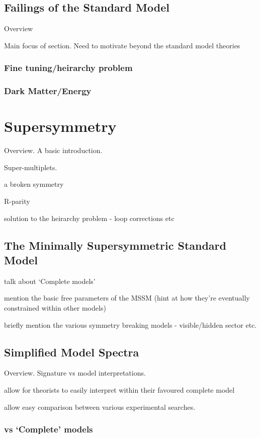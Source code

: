 \subsection{Failings of the Standard Model}
Overview

Main focus of section. Need to motivate beyond the standard model theories

\subsubsection{Fine tuning/heirarchy problem}
\subsubsection{Dark Matter/Energy}


\section{Supersymmetry}  %
\label{sec:theory_supersymmetry}
Overview. A basic introduction.

Super-multiplets.

a broken symmetry

R-parity

solution to the heirarchy problem - loop corrections etc

\subsection{The Minimally Supersymmetric Standard Model}
talk about `Complete models'

mention the basic free parameters of the MSSM (hint at how they're eventually 
constrained within other models)

briefly mention the various symmetry breaking models - visible/hidden sector 
etc.


\subsection{Simplified Model Spectra}
Overview. Signature vs model interpretations.

allow for theorists to easily interpret within their favoured complete model

allow easy comparison between various experimental searches.

\subsubsection{vs `Complete' models}
